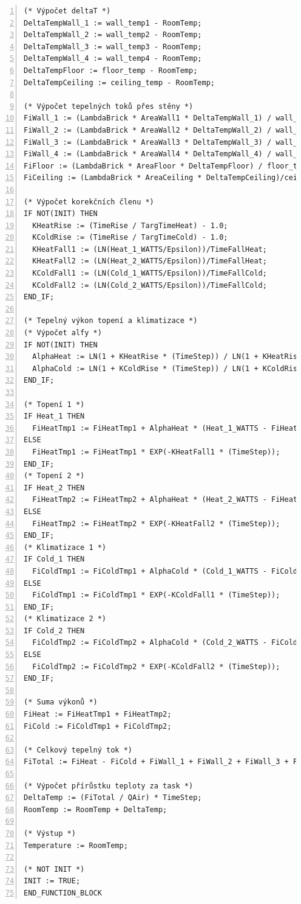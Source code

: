\begin{lstlisting}[language=ST, breaklines=true, numbers=left, numberstyle=\small, numbersep=10pt, frame=single, basicstyle=\ttfamily\small, caption={Definice funkčního bloku fbRoomTempMod}, label={lst:fbRoomTempMod}]
(* Výpočet deltaT *)
DeltaTempWall_1 := wall_temp1 - RoomTemp;
DeltaTempWall_2 := wall_temp2 - RoomTemp;
DeltaTempWall_3 := wall_temp3 - RoomTemp;
DeltaTempWall_4 := wall_temp4 - RoomTemp;
DeltaTempFloor := floor_temp - RoomTemp;
DeltaTempCeiling := ceiling_temp - RoomTemp;

(* Výpočet tepelných toků přes stěny *)
FiWall_1 := (LambdaBrick * AreaWall1 * DeltaTempWall_1) / wall_thic1;
FiWall_2 := (LambdaBrick * AreaWall2 * DeltaTempWall_2) / wall_thic2;
FiWall_3 := (LambdaBrick * AreaWall3 * DeltaTempWall_3) / wall_thic3;
FiWall_4 := (LambdaBrick * AreaWall4 * DeltaTempWall_4) / wall_thic4;
FiFloor := (LambdaBrick * AreaFloor * DeltaTempFloor) / floor_thic;
FiCeiling := (LambdaBrick * AreaCeiling * DeltaTempCeiling)/ceiling_thic;

(* Výpočet korekčních členu *)
IF NOT(INIT) THEN
  KHeatRise := (TimeRise / TargTimeHeat) - 1.0;
  KColdRise := (TimeRise / TargTimeCold) - 1.0;
  KHeatFall1 := (LN(Heat_1_WATTS/Epsilon))/TimeFallHeat;
  KHeatFall2 := (LN(Heat_2_WATTS/Epsilon))/TimeFallHeat;
  KColdFall1 := (LN(Cold_1_WATTS/Epsilon))/TimeFallCold;
  KColdFall2 := (LN(Cold_2_WATTS/Epsilon))/TimeFallCold;
END_IF;

(* Tepelný výkon topení a klimatizace *)
(* Výpočet alfy *)
IF NOT(INIT) THEN
  AlphaHeat := LN(1 + KHeatRise * (TimeStep)) / LN(1 + KHeatRise * TimeRise);
  AlphaCold := LN(1 + KColdRise * (TimeStep)) / LN(1 + KColdRise * TimeRise);
END_IF;

(* Topení 1 *)
IF Heat_1 THEN
  FiHeatTmp1 := FiHeatTmp1 + AlphaHeat * (Heat_1_WATTS - FiHeatTmp1);
ELSE
  FiHeatTmp1 := FiHeatTmp1 * EXP(-KHeatFall1 * (TimeStep));
END_IF;
(* Topení 2 *)
IF Heat_2 THEN
  FiHeatTmp2 := FiHeatTmp2 + AlphaHeat * (Heat_2_WATTS - FiHeatTmp2);
ELSE
  FiHeatTmp2 := FiHeatTmp2 * EXP(-KHeatFall2 * (TimeStep));
END_IF;
(* Klimatizace 1 *)
IF Cold_1 THEN
  FiColdTmp1 := FiColdTmp1 + AlphaCold * (Cold_1_WATTS - FiColdTmp1);
ELSE
  FiColdTmp1 := FiColdTmp1 * EXP(-KColdFall1 * (TimeStep));
END_IF;
(* Klimatizace 2 *)
IF Cold_2 THEN
  FiColdTmp2 := FiColdTmp2 + AlphaCold * (Cold_2_WATTS - FiColdTmp2);
ELSE
  FiColdTmp2 := FiColdTmp2 * EXP(-KColdFall2 * (TimeStep));
END_IF;

(* Suma výkonů *)
FiHeat := FiHeatTmp1 + FiHeatTmp2;
FiCold := FiColdTmp1 + FiColdTmp2;

(* Celkový tepelný tok *)
FiTotal := FiHeat - FiCold + FiWall_1 + FiWall_2 + FiWall_3 + FiWall_4 + FiFloor + FiCeiling;

(* Výpočet přírůstku teploty za task *)
DeltaTemp := (FiTotal / QAir) * TimeStep;
RoomTemp := RoomTemp + DeltaTemp;

(* Výstup *)
Temperature := RoomTemp;

(* NOT INIT *)
INIT := TRUE;
END_FUNCTION_BLOCK
\end{lstlisting}
\newpage
